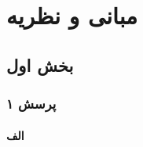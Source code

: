 
\def \Subject {مبانی و نظریه}
\def \Session { یک}
\renewcommand{\chaptername}{سوال}
\chapter{\Subject}
\section{بخش اول}
\subsection{ پرسش ۱}

\subsubsection{الف}

